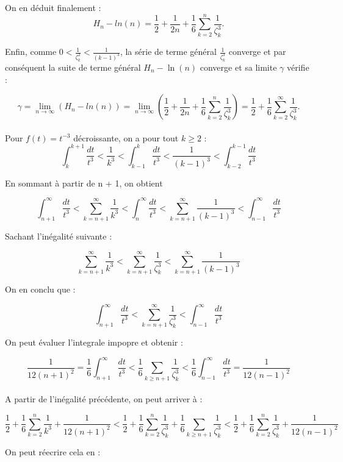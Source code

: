 \documentclass[a4paper,12pt]{article}
\begin{document}
On en déduit finalement :
\[
H_n - ln(n) = \frac{1}{2} + \frac{1}{2n} + \frac{1}{6} \sum_{k=2}^n \frac{1}{\zeta_k^3}.
\]

Enfin, comme \( 0 < \frac{1}{\zeta_k^2} < \frac{1}{(k-1)^3} \), la série de terme général \( \frac{1}{\zeta_k^3} \) converge et par conséquent la suite de terme général \( H_n - \ln(n) \) converge et sa limite \( \gamma \) vérifie :

\[
\gamma = \lim_{n \to \infty} (H_n -ln(n)) = \lim_{n \to \infty} \left( \frac{1}{2} + \frac{1}{2n} + \frac{1}{6} \sum_{k=2}^n \frac{1}{\zeta_k^3} \right) = \frac{1}{2} + \frac{1}{6} \sum_{k=2}^\infty \frac{1}{\zeta_k^3}.
\] \\

Pour $f(t) = t^{-3}$ décroissante, on a pour tout $k \geq 2$ :
\[ \int_{k}^{k+1} \frac{dt}{t^3} < \frac{1}{k^3} <  \int_{k-1}^{k} \frac{dt}{t^3} < \frac{1}{(k-1)^3} < \int_{k-2}^{k-1} \frac{dt}{t^3} \]

En sommant à partir de n + 1, on obtient

\[ \int_{n+1}^{\infty} \frac{dt}{t^3} < \sum_{k=n+1}^\infty \frac{1}{k^3} <  \int_{n}^{\infty} \frac{dt}{t^3} < \sum_{k=n+1}^\infty\frac{1}{(k-1)^3} < \int_{n-1}^{\infty} \frac{dt}{t^3} \]

Sachant l'inégalité suivante :

\[
\sum_{k=n+1}^\infty \frac{1}{k^3} < \sum_{k=n+1}^\infty \frac{1}{\zeta_k^3} < \sum_{k=n+1}^\infty\frac{1}{(k-1)^3}
\]

On en conclu que :

\[ \int_{n+1}^{\infty} \frac{dt}{t^3} < \sum_{k=n+1}^\infty \frac{1}{\zeta_k^3} < \int_{n-1}^{\infty} \frac{dt}{t^3}
\]

On peut évaluer l'integrale impopre et obtenir :

\[
\frac{1}{12(n+1)^{2}} = \frac{1}{6} \int_{n+1}^{\infty} \frac{dt}{t^{3}} < \frac{1}{6} \sum_{k \geq n+1} \frac{1}{\zeta_k^{3}} < \frac{1}{6} \int_{n-1}^{\infty} \frac{dt}{t^{3}} = \frac{1}{12(n-1)^{2}}
\] \\

A partir de l'inégalité précédente, on peut arriver à :

\[
\frac{1}{2} + \frac{1}{6} \sum_{k=2}^{n} \frac{1}{k^{3}} + \frac{1}{12(n+1)^{2}} < \frac{1}{2} + \frac{1}{6} \sum_{k=2}^{n} \frac{1}{\zeta_k^{3}} + \frac{1}{6} \sum_{k \geq n+1} \frac{1}{\zeta_k^{3}} < \frac{1}{2} + \frac{1}{6} \sum_{k=2}^{n} \frac{1}{\zeta_k^{3}}+ \frac{1}{12(n-1)^{2}}
\]

On peut réecrire cela en :
\end{document}
